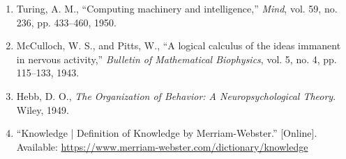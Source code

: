 \documentclass[a4paper,12pt]{article}
\begin{document}
\begin{enumerate}
    \item Turing, A. M., ``Computing machinery and intelligence,'' \textit{Mind}, vol. 59, no. 236, pp. 433--460, 1950.
    
    \item McCulloch, W. S., and Pitts, W., ``A logical calculus of the ideas immanent in nervous activity,'' \textit{Bulletin of Mathematical Biophysics}, vol. 5, no. 4, pp. 115--133, 1943.
    
    \item Hebb, D. O., \textit{The Organization of Behavior: A Neuropsychological Theory}. Wiley, 1949.
    
    \item ``Knowledge | Definition of Knowledge by Merriam-Webster.'' [Online]. Available: \url{https://www.merriam-webster.com/dictionary/knowledge}
\end{enumerate}
\end{document}
